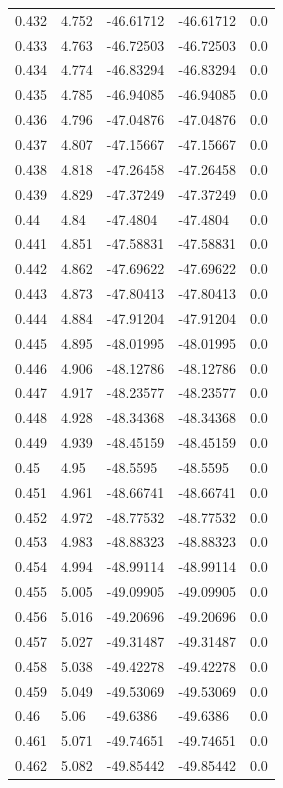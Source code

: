 \begin{tabular}{lllll}
0.432 & 4.752 & -46.61712 & -46.61712 & 0.0 \\
0.433 & 4.763 & -46.72503 & -46.72503 & 0.0 \\
0.434 & 4.774 & -46.83294 & -46.83294 & 0.0 \\
0.435 & 4.785 & -46.94085 & -46.94085 & 0.0 \\
0.436 & 4.796 & -47.04876 & -47.04876 & 0.0 \\
0.437 & 4.807 & -47.15667 & -47.15667 & 0.0 \\
0.438 & 4.818 & -47.26458 & -47.26458 & 0.0 \\
0.439 & 4.829 & -47.37249 & -47.37249 & 0.0 \\
0.44 & 4.84 & -47.4804 & -47.4804 & 0.0 \\
0.441 & 4.851 & -47.58831 & -47.58831 & 0.0 \\
0.442 & 4.862 & -47.69622 & -47.69622 & 0.0 \\
0.443 & 4.873 & -47.80413 & -47.80413 & 0.0 \\
0.444 & 4.884 & -47.91204 & -47.91204 & 0.0 \\
0.445 & 4.895 & -48.01995 & -48.01995 & 0.0 \\
0.446 & 4.906 & -48.12786 & -48.12786 & 0.0 \\
0.447 & 4.917 & -48.23577 & -48.23577 & 0.0 \\
0.448 & 4.928 & -48.34368 & -48.34368 & 0.0 \\
0.449 & 4.939 & -48.45159 & -48.45159 & 0.0 \\
0.45 & 4.95 & -48.5595 & -48.5595 & 0.0 \\
0.451 & 4.961 & -48.66741 & -48.66741 & 0.0 \\
0.452 & 4.972 & -48.77532 & -48.77532 & 0.0 \\
0.453 & 4.983 & -48.88323 & -48.88323 & 0.0 \\
0.454 & 4.994 & -48.99114 & -48.99114 & 0.0 \\
0.455 & 5.005 & -49.09905 & -49.09905 & 0.0 \\
0.456 & 5.016 & -49.20696 & -49.20696 & 0.0 \\
0.457 & 5.027 & -49.31487 & -49.31487 & 0.0 \\
0.458 & 5.038 & -49.42278 & -49.42278 & 0.0 \\
0.459 & 5.049 & -49.53069 & -49.53069 & 0.0 \\
0.46 & 5.06 & -49.6386 & -49.6386 & 0.0 \\
0.461 & 5.071 & -49.74651 & -49.74651 & 0.0 \\
0.462 & 5.082 & -49.85442 & -49.85442 & 0.0 \\

\end{tabular}
